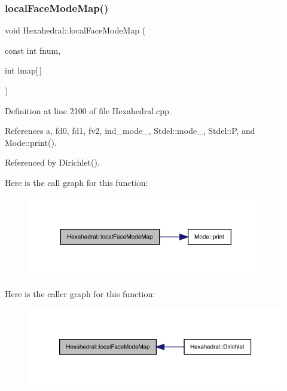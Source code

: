 \mbox{\label{classHexahedral_a9692307cd160489de6e8467863938dae}} 
\subsubsection{\texorpdfstring{local\+Face\+Mode\+Map()}{localFaceModeMap()}}
{\footnotesize\ttfamily void Hexahedral\+::local\+Face\+Mode\+Map (\begin{DoxyParamCaption}\item[{const int}]{fnum,  }\item[{int}]{lmap\mbox{[}$\,$\mbox{]} }\end{DoxyParamCaption})}



Definition at line 2100 of file Hexahedral.\+cpp.



References a, fd0, fd1, fv2, ind\+\_\+mode\+\_\+, Stdel\+::mode\+\_\+, Stdel\+::P, and Mode\+::print().



Referenced by Dirichlet().

Here is the call graph for this function\+:
\nopagebreak
\begin{figure}[H]
\begin{center}
\leavevmode
\includegraphics[width=294pt]{classHexahedral_a9692307cd160489de6e8467863938dae_cgraph}
\end{center}
\end{figure}
Here is the caller graph for this function\+:
\nopagebreak
\begin{figure}[H]
\begin{center}
\leavevmode
\includegraphics[width=326pt]{classHexahedral_a9692307cd160489de6e8467863938dae_icgraph}
\end{center}
\end{figure}
\mbox{\label{classHexahedral_a2bf67c9399982ead12bd08efaf90dc3c}} 
